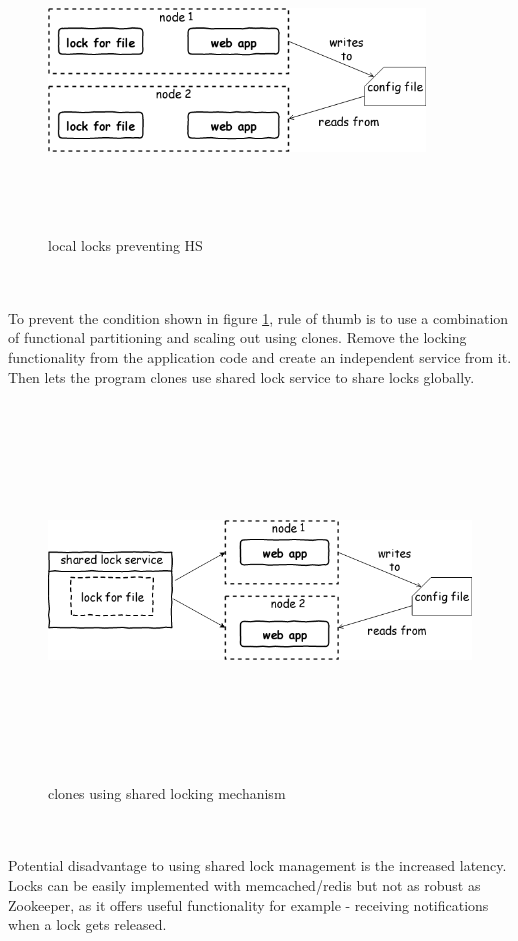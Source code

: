 \begin{figure}[h!]
  \centering
  \includegraphics[width=10cm,height=8cm,keepaspectratio]{../media/crawler/wrng-local-locks.png}
  \caption{local locks preventing HS}
  \label{fig:wrnglocks}
\end{figure}
\\
\\
\noindent
To prevent the condition shown in figure \ref{fig:wrnglocks}, rule of thumb is to
use a combination of functional partitioning and scaling out using clones. Remove
the locking functionality from the application code and create an independent
service from it. Then lets the program clones use shared lock service to share
locks globally.

\pagebreak

\begin{figure}[h!]
  \centering
  \includegraphics[width=13cm,height=10cm,keepaspectratio]{../media/crawler/rght-shared-locks.png}
  \caption{clones using shared locking mechanism}
  \label{fig:rghtlocks}
\end{figure}
\\
\\
\noindent
Potential disadvantage to using shared lock management is the increased latency.
Locks can be easily implemented with memcached/redis but not as robust as Zookeeper,
as it offers useful functionality for example - receiving notifications when a
lock gets released.